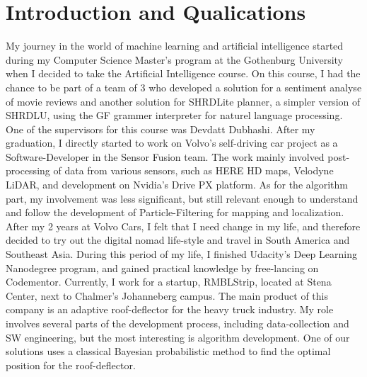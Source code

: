 \documentclass[12pt]{article}
\begin{document}
\maketitle

\section*{Introduction and Qualications}
My journey in the world of machine learning and artificial intelligence started during my Computer Science Master's program at the Gothenburg University when I decided to take the Artificial Intelligence course. On this course, I had the chance to be part of a team of 3 who developed a solution for a sentiment analyse of movie reviews and another solution for SHRDLite planner, a simpler version of SHRDLU\cite{win1970shrdlu}, using the GF\cite{gf} grammer interpreter for naturel language processing. One of the supervisors for this course was Devdatt Dubhashi.
After my graduation, I directly started to work on Volvo's self-driving car project as a Software-Developer in the Sensor Fusion team. The work mainly involved post-processing of data from various sensors, such as HERE HD maps, Velodyne LiDAR, and development on Nvidia's Drive PX platform. As for the algorithm part, my involvement was less significant, but still relevant enough to understand and follow the development of Particle-Filtering for mapping and localization.
After my 2 years at Volvo Cars, I felt that I need change in my life, and therefore decided to try out the digital nomad life-style and travel in South America and Southeast Asia. During this period of my life, I finished Udacity's Deep Learning Nanodegree program, and gained practical knowledge by free-lancing on Codementor.
Currently, I work for a startup, RMBLStrip, located at Stena Center, next to Chalmer's Johanneberg campus. The main product of this company is an adaptive roof-deflector for the heavy truck industry. My role involves several parts of the development process, including data-collection and SW engineering, but the most interesting is algorithm development. One of our solutions uses a classical Bayesian probabilistic method to find the optimal position for the roof-deflector.
\end{document}
